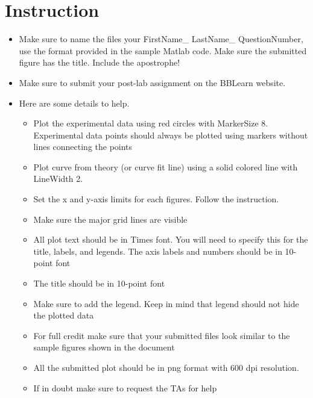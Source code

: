 \documentclass{article} %
\begin{document}
\section{Instruction}
\begin{itemize}
\item Make sure to name the files your FirstName\_ LastName\_ QuestionNumber, use the format provided in the sample Matlab code. Make sure the submitted figure has the title. Include the apostrophe!
\item Make sure to submit your post-lab assignment on the BBLearn website. 
\item Here are some details to help. 
\begin{itemize}
\item Plot  the experimental data using red circles with MarkerSize 8. Experimental data points should always be plotted using markers without lines connecting the points
\item Plot curve from theory (or curve fit line) using a solid colored line with LineWidth 2. 
\item  Set the x and y-axis limits for each figures. Follow the instruction.
\item Make sure the major grid lines are visible
\item All plot text should be in Times font. You will need to specify this for the title, labels, and
legends. The axis labels and numbers should be in 10-point font
\item The title should be in 10-point font
\item Make sure to add the legend. Keep in mind that legend should not hide the plotted data
\item For full credit make sure that your submitted files look similar to the sample figures shown in the document
\item All the submitted plot should be in png format with 600 dpi resolution.
\item If in doubt make sure to request the TAs for help
\end{itemize}
\end{itemize}
\end{document}
